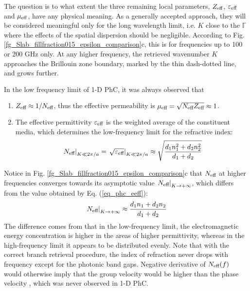 The question is to what extent the three remaining local parameters, $Z_{\text{eff} }$, $\varepsilon_{\text{eff} }$ and $\mu_{\text{eff} }$, have any physical meaning. As a generally accepted approach, they will be considered meaningful only for the long wavelength limit, i.e. $K$ close to the $\mathbb{\Gamma}$ where the effects of the spatial dispersion should be negligible. According to Fig. \ref{fg_Slab_fillfraction015_epsilon_comparison}c, this is for frequencies up to 100 or 200 GHz only. At any higher frequency, the retrieved wavenumber $K$ approaches the Brillouin zone boundary, marked by the thin dash-dotted line, and grows further.

In the low frequency limit of 1-D PhC, it was always observed that
\begin{enumerate}
\item{$Z_{\text{eff} } \approx 1/N_{\text{eff} }$, thus the effective permeability is $\mu_{\text{eff} } = \sqrt{N_{\text{eff} }Z_{\text{eff} }} \approx 1$.} 
\item{The effective permittivity $\varepsilon_{\text{eff} }$ is the weighted average of the constituent media, which determines the low-frequency limit for the refractive index:
	\begin{equation} \left.N_{\text{eff} }\right|_{K\ll 2\pi/a} =\left. \sqrt{\varepsilon_{\text{eff} }}\right|_{K\ll 2\pi/a} \approx \sqrt{\frac{d_1 n_1^{2} + d_2 n_2^{2}}{d_1+d_2}} \label{eq_phc_eeff}\end{equation}
	}
\end{enumerate}
Notice in Fig. \ref{fg_Slab_fillfraction015_epsilon_comparison}c that $N_{\text{eff} }$ at higher frequencies converges towards its asymptotic value $\left.N_{\text{eff} }\right|_{K\rightarrow +\infty}$, which differs from the value obtained by Eq. (\ref{eq_phc_eeff}):
\begin{equation} \left.N_{\text{eff} }\right|_{K\rightarrow +\infty} \approx \frac{d_1 n_1 + d_2 n_2}{d_1+d_2} \label{eq_phc_neff}\end{equation}
The difference comes from that in the low-frequency limit, the electromagnetic energy concentration is higher in the areas of higher permittivity, whereas in the high-frequency limit it appears to be distributed evenly.
Note that with the correct branch retrieval procedure, the index of refraction never drops with frequency except for the photonic band gaps. Negative derivative of $N_{\text{eff} }(f)$ would otherwise imply that the group velocity would be higher than the phase velocity \cite{mikki2009electromagnetic}, which was never observed in 1-D PhC.

